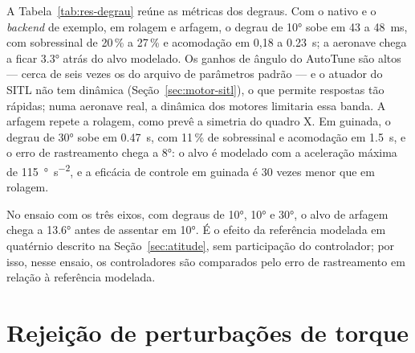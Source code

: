 A Tabela~\ref{tab:res-degrau} reúne as métricas dos degraus. Com o nativo e o
\textit{backend} de exemplo, em rolagem e
arfagem, o degrau de \ang{10} sobe em 43 a \SI{48}{\milli\second}, com
sobressinal de 20\,\% a 27\,\% e acomodação em 0,18 a \SI{0.23}{\second}; a
aeronave chega a ficar \ang{3.3} atrás do alvo modelado. Os ganhos de ângulo
do AutoTune são altos --- cerca de seis vezes os do arquivo de parâmetros
padrão --- e o atuador do SITL não tem dinâmica (Seção~\ref{sec:motor-sitl}),
o que permite respostas tão rápidas; numa aeronave real, a dinâmica dos
motores limitaria essa banda. A arfagem repete a rolagem, como prevê a
simetria do quadro X. Em guinada, o degrau de \ang{30} sobe em
\SI{0.47}{\second}, com 11\,\% de sobressinal e acomodação em
\SI{1.5}{\second}, e o erro de rastreamento chega a \ang{8}: o alvo é
modelado com a aceleração máxima de \SI{115}{\degree\per\second\squared}, e
a eficácia de controle em guinada é 30 vezes menor que em rolagem.

No ensaio com os três eixos, com degraus de \ang{10}, \ang{10} e \ang{30}, o
alvo de arfagem chega a \ang{13.6} antes de assentar em \ang{10}. É o efeito
da referência modelada em quatérnio descrito na Seção~\ref{sec:atitude}, sem
participação do controlador; por isso, nesse ensaio, os controladores são
comparados pelo erro de rastreamento em relação à referência modelada.

\section{Rejeição de perturbações de torque}
\label{sec:res-torque}

\begin{table}[htbp]
\centering
\caption{Rejeição de torque: degrau curto de
\SI{15}{\radian\per\second\squared} (rolagem e arfagem) e
\SI{3}{\radian\per\second\squared} (guinada) por \SI{0.3}{\second}, e degrau
de 10 e \SI{1}{\radian\per\second\squared}.}
\label{tab:res-torque}
\small
\resizebox{\textwidth}{!}{}

\nota{\raggedright }
\end{table}


